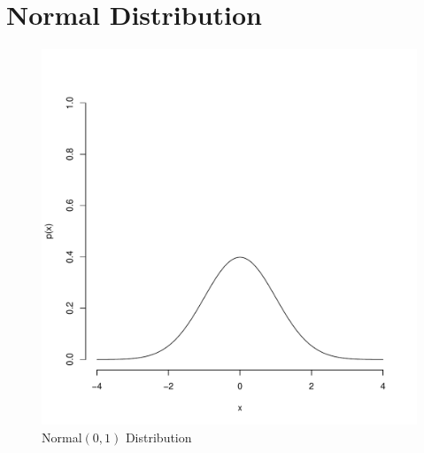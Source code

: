\documentclass{tufte-handout}
\begin{document}
\section{Normal Distribution}
\begin{figure}
    \caption{Normal$(0,1)$ Distribution}
    \centering
    \includegraphics[width=.70\textwidth]{../distributions/normal/normal_bw.pdf}
\end{figure}
\end{document}
